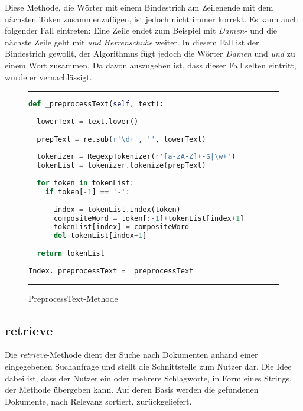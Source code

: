 Diese Methode, die Wörter mit einem Bindestrich am Zeilenende mit dem nächsten Token zusammenzufügen, ist jedoch nicht immer korrekt. Es kann auch folgender Fall eintreten: Eine Zeile endet zum Beispiel mit \textit{Damen-} und die nächste Zeile geht mit \textit{und Herrenschuhe} weiter. In diesem Fall ist der Bindestrich gewollt, der Algorithmus fügt jedoch die Wörter \textit{Damen} und \textit{und} zu einem Wort zusammen. Da davon auszugehen ist, dass dieser Fall selten eintritt, wurde er vernachlässigt.

\begin{figure}
	\rule{\textwidth}{0.4pt}
		\begin{lstlisting}[language=Python]
def _preprocessText(self, text):
    
  lowerText = text.lower()
    
  prepText = re.sub(r'\d+', '', lowerText)
            
  tokenizer = RegexpTokenizer(r'[a-zA-Z]+-$|\w+')
  tokenList = tokenizer.tokenize(prepText)
    
  for token in tokenList:
    if token[-1] == '-':
            
      index = tokenList.index(token)
      compositeWord = token[:-1]+tokenList[index+1]
      tokenList[index] = compositeWord
      del tokenList[index+1]
            
  return tokenList
    
Index._preprocessText = _preprocessText
		\end{lstlisting}
	\rule{\textwidth}{0.4pt}
	\caption{PreprocessText-Methode}
	\label{fig:preprocess}
\end{figure}

\subsection{retrieve}\label{retrieve}

Die \textit{retrieve}-Methode dient der Suche nach Dokumenten anhand einer eingegebenen Suchanfrage und stellt die Schnittstelle zum Nutzer dar. Die Idee dabei ist, dass der Nutzer ein oder mehrere Schlagworte, in Form eines Strings, der Methode übergeben kann. Auf deren Basis werden die gefundenen Dokumente, nach Relevanz sortiert, zurückgeliefert. 

